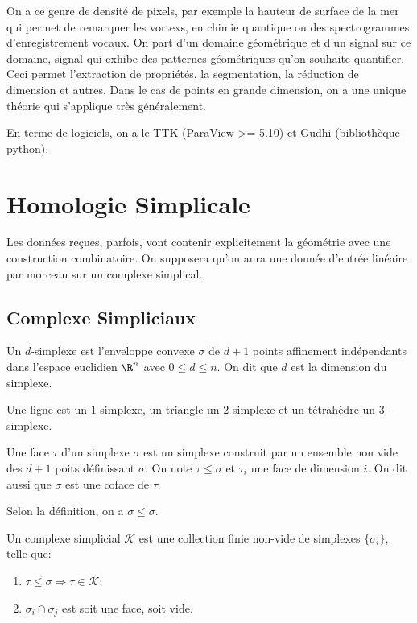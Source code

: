 \documentclass[info, math]{mpb-cours}
\begin{document}
On a ce genre de densité de pixels, par exemple la hauteur de surface de la mer qui permet
de remarquer les vortexs, en chimie quantique ou des spectrogrammes d'enregistrement vocaux.
On part d'un domaine géométrique et d'un signal sur ce domaine, signal qui exhibe des patternes géométriques
qu'on souhaite quantifier.
Ceci permet l'extraction de propriétés, la segmentation, la réduction de dimension et autres.
Dans le cas de points en grande dimension, on a une unique théorie qui s'applique très généralement.

En terme de logiciels, on a le TTK (ParaView >= 5.10) et Gudhi (bibliothèque python).

\section{Homologie Simplicale}
Les données reçues, parfois, vont contenir explicitement la géométrie avec une construction combinatoire.
On supposera qu'on aura une donnée d'entrée linéaire par morceau sur un complexe simplical.

\subsection{Complexe Simpliciaux}
\begin{definition}
	Un $d$-simplexe est l'enveloppe convexe $\sigma$ de $d + 1$ points affinement indépendants dans l'espace euclidien $\R^{n}$ avec $0 \leq d \leq n$.
	On dit que $d$ est la dimension du simplexe.
\end{definition}

Une ligne est un $1$-simplexe, un triangle un $2$-simplexe et un tétrahèdre un $3$-simplexe.

\begin{definition}
	Une face $\tau$ d'un simplexe $\sigma$ est un simplexe construit par un ensemble non vide des $d + 1$ poits définissant $\sigma$.
	On note $\tau \leq \sigma$ et $\tau_{i}$ une face de dimension $i$.
	On dit aussi que $\sigma$ est une coface de $\tau$.
\end{definition}
Selon la définition, on a $\sigma \leq \sigma$.

\begin{definition}
	Un complexe simplicial $\mathcal{K}$ est une collection finie non-vide de simplexes $\{\sigma_{i}\}$, telle que:
	\begin{enumerate}
		\item $\tau \leq \sigma \Rightarrow \tau \in \mathcal{K}$;
		\item $\sigma_{i} \cap \sigma_{j}$ est soit une face, soit vide.
	\end{enumerate}
\end{definition}
\end{document}
